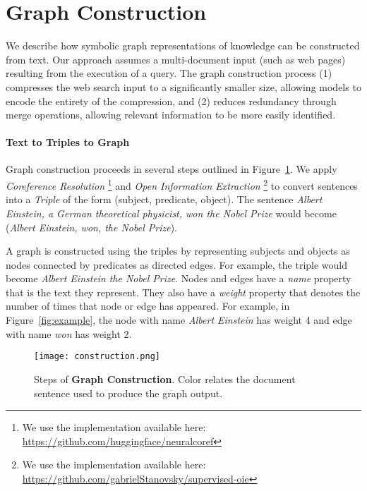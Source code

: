 \documentclass[11pt,a4paper]{article}
\begin{document}
\section{Graph Construction}

We describe how symbolic graph representations of knowledge can be constructed from text. Our approach assumes a multi-document input (such as web pages) resulting from the execution of a query. The graph construction process (1) compresses the web search input to a significantly smaller size, allowing  models to encode the entirety of the compression, and (2) reduces redundancy through merge operations, allowing relevant information to be more easily identified. 

\paragraph{Text to Triples to Graph} Graph construction proceeds in several steps outlined in Figure~\ref{fig:construction}. We apply \textit{Coreference Resolution} \cite{clark2016deep,clark2016improving}\footnote{We use the implementation available here: \url{https://github.com/huggingface/neuralcoref}} and \textit{Open Information Extraction} \cite{stanovsky2018supervised}\footnote{We use the implementation available here: \url{https://github.com/gabrielStanovsky/supervised-oie}} to convert sentences into a \textit{Triple} of the form (subject, predicate, object). The sentence \textit{Albert Einstein, a German theoretical physicist, won the Nobel Prize} would become (\textit{Albert Einstein, won, the Nobel Prize}). 

A graph is constructed using the triples by representing subjects and objects as nodes connected by predicates as directed edges. For example, the triple would become \textit{Albert Einstein}  \textit{the Nobel Prize}. Nodes and edges have a \textit{name} property that is the text they represent. They also have a \textit{weight} property that denotes the number of times that node or edge has appeared. For example, in Figure~\ref{fig:example}, the node with name \textit{Albert Einstein} has weight 4 and edge with name \textit{won} has weight 2. 

\begin{figure}[t!]
    \centering
    \texttt{[image: construction.png]}
    \caption{Steps of \textbf{Graph Construction}. Color relates the document sentence used to produce the graph output.}
    \label{fig:construction}
\end{figure}
\end{document}
